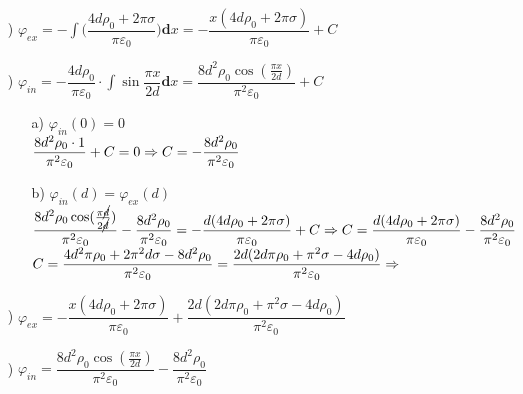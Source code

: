\documentclass[a4paper,12pt]{article}
\newcommand{\dx}{\textbf{d}x}
\newcommand{\dint}{\displaystyle\int}
\newcommand{\RomanNumeralCaps}[1]{\MakeUppercase{\romannumeral #1}}
\begin{document}
	\begin{enumerate}
		\item[\RomanNumeralCaps{1})]
		$\varphi_{ex}=-\dint\bigg(\dfrac{4d\rho_0+2\pi\sigma}{\pi\varepsilon_0}\bigg)\dx=-\dfrac{x(4d\rho_0+2\pi\sigma)}{\pi\varepsilon_0}+C$
		\item[\RomanNumeralCaps{2})]
		$\varphi_{in}=-\dfrac{4d\rho_0}{\pi\varepsilon_0}\cdot\dint\sin\dfrac{\pi x}{2d}\dx=\dfrac{8d^2\rho_0\cos(\frac{\pi x}{2d})}{\pi^2\varepsilon_0}+C$
		\begin{enumerate}
			\item[a)] $\varphi_{in}(0)=0$ \\
			$\\ \dfrac{8d^2\rho_0\cdot1}{\pi^2\varepsilon_0}+C=0\Rightarrow C=-\dfrac{8d^2\rho_0}{\pi^2\varepsilon_0}$
			\item[b)] $\varphi_{in}(d)=\varphi_{ex}(d)$ \\
			$\\ \dfrac{8d^2\rho_0\cos(\frac{\pi \cancel{d}}{2\cancel{d}})}{\pi^2\varepsilon_0}-\dfrac{8d^2\rho_0}{\pi^2\varepsilon_0}=-\dfrac{d(4d\rho_0+2\pi\sigma)}{\pi\varepsilon_0}+C \Rightarrow C=\dfrac{d(4d\rho_0+2\pi\sigma)}{\pi\varepsilon_0}-\dfrac{8d^2\rho_0}{\pi^2\varepsilon_0}$\\
			$\\C=\dfrac{4d^2\pi\rho_0+2\pi^2d\sigma-8d^2\rho_0}{\pi^2\varepsilon_0}=\dfrac{2d(2d\pi\rho_0+\pi^2\sigma-4d\rho_0)}{\pi^2\varepsilon_0}\Rightarrow$
		\end{enumerate}
	\end{enumerate}
	
\newpage
	\begin{enumerate}
		\item[\RomanNumeralCaps{3})]$\varphi_{ex}=-\dfrac{x(4d\rho_0+2\pi\sigma)}{\pi\varepsilon_0}+\dfrac{2d(2d\pi\rho_0+\pi^2\sigma-4d\rho_0)}{\pi^2\varepsilon_0}$\\
		\item[\RomanNumeralCaps{4})]$\varphi_{in}=\dfrac{8d^2\rho_0\cos(\frac{\pi x}{2d})}{\pi^2\varepsilon_0}-\dfrac{8d^2\rho_0}{\pi^2\varepsilon_0}$
	\end{enumerate}
	
\end{document}
